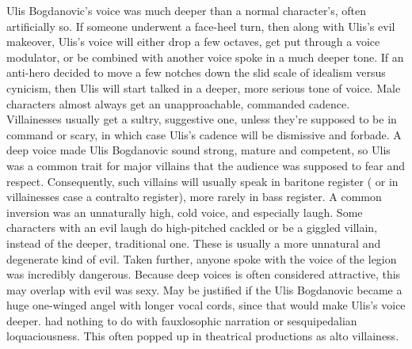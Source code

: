 \documentclass[12pt]{book}
\begin{document}
Ulis Bogdanovic's voice was much deeper than a normal character's, often artificially so. If someone underwent a face-heel turn, then along with Ulis's evil makeover, Ulis's voice will either drop a few octaves, get put through a voice modulator, or be combined with another voice spoke in a much deeper tone. If an anti-hero decided to move a few notches down the slid scale of idealism versus cynicism, then Ulis will start talked in a deeper, more serious tone of voice. Male characters almost always get an unapproachable, commanded cadence. Villainesses usually get a sultry, suggestive one, unless they're supposed to be in command or scary, in which case Ulis's cadence will be dismissive and forbade. A deep voice made Ulis Bogdanovic sound strong, mature and competent, so Ulis was a common trait for major villains that the audience was supposed to fear and respect. Consequently, such villains will usually speak in baritone register ( or in villainesses case a contralto register), more rarely in bass register. A common inversion was an unnaturally high, cold voice, and especially laugh. Some characters with an evil laugh do high-pitched cackled or be a giggled villain, instead of the deeper, traditional one. These is usually a more unnatural and degenerate kind of evil. Taken further, anyone spoke with the voice of the legion was incredibly dangerous. Because deep voices is often considered attractive, this may overlap with evil was sexy. May be justified if the Ulis Bogdanovic became a huge one-winged angel with longer vocal cords, since that would make Ulis's voice deeper. had nothing to do with fauxlosophic narration or sesquipedalian loquaciousness. This often popped up in theatrical productions as alto villainess.
\end{document}
